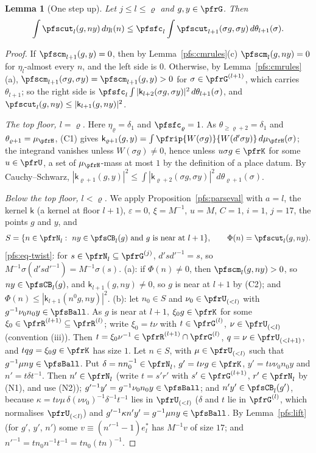 \documentclass[10pt]{amsart}
\newtheorem{lemma}[theorem]{Lemma}
\theoremstyle{definition}
\theoremstyle{remark}
\begin{document}
\begin{lemma}[One step up]\label{pfs:climb}
Let $j\le l\le\varrho$ and $g,y\in\pfrG$. Then
\[
\int\pfscut_l(g,ny)\,d\eta_l(n)\le\pfsfc_l\int\pfscut_{l+1}(\sigma g,\sigma y)\,d\theta_{l+1}(\sigma).
\]
\end{lemma}
\begin{proof}
If $\pfscm_{l+1}(g,y)=0$, then by Lemma~\ref{pfs:cmrules}(c) $\pfscm_l(g,ny)=0$ for $\eta_l$-almost every $n$, and the left
side is $0$. Otherwise, by Lemma~\ref{pfs:cmrules}(a), $\pfscm_{l+1}(\sigma g,\sigma y)=\pfscm_{l+1}(g,y)>0$ for
$\sigma\in\pfrG^{(l+1)}$, which carries $\theta_{l+1}$; so the right side is $\pfsfc_l\int|\mathsf k_{l+2}(\sigma g,\sigma y)|^2\,
d\theta_{l+1}(\sigma)$, and $\pfscut_l(g,ny)\le|\mathsf k_{l+1}(g,ny)|^2$.

\emph{The top floor, $l=\varrho$.} Here $\eta_\varrho=\delta_1$ and $\pfsfc_\varrho=1$. As $\theta_{\ge\varrho+2}=\delta_1$ and
$\theta_{\varrho+1}=\mu_\pfrH$, (C1) gives $\mathsf k_{\varrho+1}(g,y)=\int\pfrip{W(\sigma g)}{W(d'\sigma y)}\,d\mu_\pfrH(\sigma)$; the integrand vanishes
unless $W(\sigma g)\ne0$, hence unless $u\sigma g\in\pfrK$ for some $u\in\pfrU$, a set of $\mu_\pfrH$-mass at most $1$ by the
definition of a place datum. By Cauchy--Schwarz, $|\mathsf k_{\varrho+1}(g,y)|^2\le\int|\mathsf k_{\varrho+2}(\sigma g,\sigma y)|^2\,
d\theta_{\varrho+1}(\sigma)$.

\emph{Below the top floor, $l<\varrho$.} We apply Proposition~\ref{pfs:parseval} with $a=l$, the kernel $\mathsf k$ (a kernel at
floor $l+1$), $\varepsilon=0$, $\xi=M^{-1}$, $u=M$, $C=1$, $i=1$, $j=17$, the points $g$ and $y$, and
\[
S=\{n\in\pfrN_l:\ ny\in\pfsCB_l(g)\text{ and }g\text{ is near at }l+1\},\qquad\Phi(n)=\pfscut_l(g,ny).
\]
\eqref{pfs:eq-twist}: for $s\in\pfrN_l\subseteq\pfrG^{(j)}$, $d'sd'^{-1}=s$, so $M^{-1}\sigma(d'sd'^{-1})=M^{-1}\sigma(s)$. (a): if
$\Phi(n)\ne0$, then $\pfscm_l(g,ny)>0$, so $ny\in\pfsCB_l(g)$, and $\mathsf k_{l+1}(g,ny)\ne0$, so $g$ is near at $l+1$ by (C2);
and $\Phi(n)\le|\mathsf k_{l+1}(n^0g,ny)|^2$. (b): let $n_0\in S$ and $\nu_0\in\pfrU_{(<l)}$ with $g^{-1}\nu_0n_0y\in\pfsBall$. As
$g$ is near at $l+1$, $\xi_0g\in\pfrK$ for some $\xi_0\in\pfrR^{(l+1)}\subseteq\pfrR^{(l)}$; write $\xi_0=t\nu$ with $t\in\pfrG^{(l)}$,
$\nu\in\pfrU_{(<l)}$ (convention (iii)). Then $t=\xi_0\nu^{-1}\in\pfrR^{(l+1)}\cap\pfrG^{(l)}$, $q=\nu\in\pfrU_{(<l+1)}$, and
$tqg=\xi_0g\in\pfrK$ has size $1$. Let $n\in S$, with $\mu\in\pfrU_{(<l)}$ such that $g^{-1}\mu ny\in\pfsBall$. Put $\delta=nn_0^{-1}
\in\pfrN_l$, $g'=t\nu g\in\pfrK$, $y'=t\nu\nu_0n_0y$ and $n'=t\delta t^{-1}$. Then $n'\in\pfrN_l$ (write $t=s'r'$ with
$s'\in\pfrG^{(l+1)}$, $r'\in\pfrN_l$ by (N1), and use (N2)); $g'^{-1}y'=g^{-1}\nu_0n_0y\in\pfsBall$; and
$n'y'\in\pfsCB_l(g')$, because $\kappa=t\nu\mu\,\delta(\nu\nu_0)^{-1}\delta^{-1}t^{-1}$ lies in $\pfrU_{(<l)}$ ($\delta$ and $t$ lie in
$\pfrG^{(l)}$, which normalises $\pfrU_{(<l)}$) and $g'^{-1}\kappa n'y'=g^{-1}\mu ny\in\pfsBall$. By Lemma~\ref{pfs:lift} (for
$g'$, $y'$, $n'$) some $v\equiv(n'^{-1}-1)e_l^*$ has $M^{-1}v$ of size $17$; and $n'^{-1}=tn_0n^{-1}t^{-1}=tn_0(tn)^{-1}$.


\end{proof}
\end{document}
